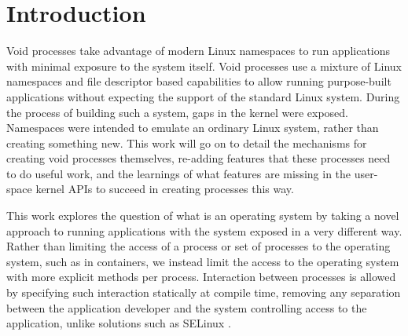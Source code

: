 \documentclass[sigplan]{acmart}
\begin{document}



\maketitle

\section{Introduction}

Void processes take advantage of modern Linux namespaces to run applications with minimal exposure to the system itself. Void processes use a mixture of Linux namespaces and file descriptor based capabilities to allow running purpose-built applications without expecting the support of the standard Linux system. During the process of building such a system, gaps in the kernel were exposed. Namespaces were intended to emulate an ordinary Linux system, rather than creating something new. This work will go on to detail the mechanisms for creating void processes themselves, re-adding features that these processes need to do useful work, and the learnings of what features are missing in the user-space kernel APIs to succeed in creating processes this way.

This work explores the question of what is an operating system by taking a novel approach to running applications with the system exposed in a very different way. Rather than limiting the access of a process or set of processes to the operating system, such as in containers, we instead limit the access to the operating system with more explicit methods per process. Interaction between processes is allowed by specifying such interaction statically at compile time, removing any separation between the application developer and the system controlling access to the application, unlike solutions such as SELinux \citep{loscocco_security-enhanced_2000}.
\end{document}
